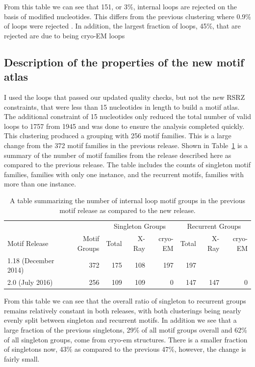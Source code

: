 From this table we can see that 151, or 3\%, internal loops are rejected on the
basis of modified nucleotides. This differs from the previous clustering where
0.9\% of loops were rejected \cite{Petrov2012}. In addition, the largest
fraction of loops, 45\%, that are rejected are due to being cryo-EM loops

\subsection{Description of the properties of the new motif atlas}

I used the loops that passed our updated quality checks, but not the new RSRZ
constraints, that were less than 15 nucleotides in length to build a motif
atlas. The additional constraint of 15 nucleotides only reduced the total number
of valid loops to 1757 from 1945 and was done to ensure the analysis completed
quickly. This clustering produced a grouping with 256 motif families. This is a
large change from the 372 motif families in the previous release. Shown in
Table~\ref{tab:loop-counts} is a summary of the number of motif families from
the release described here as compared to the previous release. The table
includes the counts of singleton motif families, families with only one
instance, and the recurrent motifs, families with more than one instance.

\begin{table}
  \begin{tabular}{lrrrrrrr}
    \toprule
                  &                                      & \multicolumn{3}{c}{Singleton Groups} & \multicolumn{3}{c}{Recurrent Groups} \\
    \cmidrule(r){3-5} \cmidrule(r){6-8}
    Motif Release &
      Motif Groups &
      Total & X-Ray & cryo-EM &
      Total & X-Ray & cryo-EM \\
    \midrule
    1.18 (December 2014) & 372 & 175 & 108 & 197 & 197 &     &   \\
    2.0 (July 2016)      & 256 & 109 & 109 & 0   & 147 & 147 & 0 \\
    \bottomrule
  \end{tabular}
  \caption{A table summarizing the number of internal loop motif groups in the
  previous motif release as compared to the new release. }
  \label{tab:loop-counts}
\end{table}

From this table we can see that the overall ratio of singleton to recurrent
groups remains relatively constant in both releases, with both clusterings being
nearly evenly split between singleton and recurrent motifs. In addition we see
that a large fraction of the previous singletons, 29\% of all motif groups
overall and 62\% of all singleton groups, come from cryo-em structures. There is
a smaller fraction of singletons now, 43\% as compared to the previous 47\%,
however, the change is fairly small.

